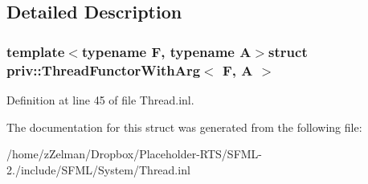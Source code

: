\subsection{Detailed Description}
\subsubsection*{template$<$typename F, typename A$>$struct priv\-::\-Thread\-Functor\-With\-Arg$<$ F, A $>$}



Definition at line 45 of file Thread.\-inl.



The documentation for this struct was generated from the following file\-:\begin{DoxyCompactItemize}
\item 
/home/z\-Zelman/\-Dropbox/\-Placeholder-\/\-R\-T\-S/\-S\-F\-M\-L-\/2./include/\-S\-F\-M\-L/\-System/Thread.\-inl\end{DoxyCompactItemize}
